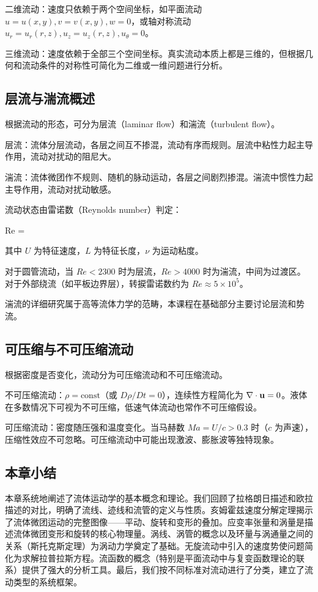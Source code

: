 二维流动：速度只依赖于两个空间坐标，如平面流动 \(u=u(x,y), v=v(x,y), w=0\)，或轴对称流动 \(u_r=u_r(r,z), u_z=u_z(r,z), u_\theta=0\)。

三维流动：速度依赖于全部三个空间坐标。真实流动本质上都是三维的，但根据几何和流动条件的对称性可简化为二维或一维问题进行分析。

\subsection{层流与湍流概述}

根据流动的形态，可分为层流（laminar flow）和湍流（turbulent flow）。

层流：流体分层流动，各层之间互不掺混，流动有序而规则。层流中粘性力起主导作用，流动对扰动的阻尼大。

湍流：流体微团作不规则、随机的脉动运动，各层之间剧烈掺混。湍流中惯性力起主导作用，流动对扰动敏感。

流动状态由雷诺数（Reynolds number）判定：

\begin{myformula}
Re = 
\end{myformula}

其中 \(U\) 为特征速度，\(L\) 为特征长度，\(\nu\) 为运动粘度。

对于圆管流动，当 \(Re < 2300\) 时为层流，\(Re > 4000\) 时为湍流，中间为过渡区。对于外部绕流（如平板边界层），转捩雷诺数约为 \(Re \approx 5\times 10^5\)。

湍流的详细研究属于高等流体力学的范畴，本课程在基础部分主要讨论层流和势流。

\subsection{可压缩与不可压缩流动}

根据密度是否变化，流动分为可压缩流动和不可压缩流动。

不可压缩流动：\(\rho = \text{const}\)（或 \(D\rho/Dt = 0\)），连续性方程简化为 \(\nabla\cdot\mathbf{u} = 0\)。液体在多数情况下可视为不可压缩，低速气体流动也常作不可压缩假设。

可压缩流动：密度随压强和温度变化。当马赫数 \(Ma = U/c > 0.3\) 时（\(c\) 为声速），压缩性效应不可忽略。可压缩流动中可能出现激波、膨胀波等独特现象。

\subsection{本章小结}

本章系统地阐述了流体运动学的基本概念和理论。我们回顾了拉格朗日描述和欧拉描述的对比，明确了流线、迹线和流管的定义与性质。亥姆霍兹速度分解定理揭示了流体微团运动的完整图像——平动、旋转和变形的叠加。应变率张量和涡量是描述流体微团变形和旋转的核心物理量。涡线、涡管的概念以及环量与涡通量之间的关系（斯托克斯定理）为涡动力学奠定了基础。无旋流动中引入的速度势使问题简化为求解拉普拉斯方程。流函数的概念（特别是平面流动中与复变函数理论的联系）提供了强大的分析工具。最后，我们按不同标准对流动进行了分类，建立了流动类型的系统框架。

